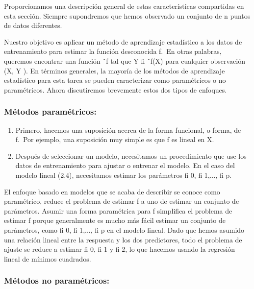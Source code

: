 \documentclass[
  letterpaper,
  DIV=11,
  numbers=noendperiod]{scrartcl}
\providecommand{\tightlist}{%
  \setlength{\itemsep}{0pt}\setlength{\parskip}{0pt}}\usepackage{longtable,booktabs,array}
\begin{document}
Proporcionamos una descripción general de estas características
compartidas en esta sección. Siempre supondremos que hemos observado un
conjunto de n puntos de datos diferentes.

Nuestro objetivo es aplicar un método de aprendizaje estadístico a los
datos de entrenamiento para estimar la función desconocida f.~En otras
palabras, queremos encontrar una función ˆf tal que Y fi ˆf(X) para
cualquier observación (X, Y ). En términos generales, la mayoría de los
métodos de aprendizaje estadístico para esta tarea se pueden
caracterizar como paramétricos o no paramétricos. Ahora discutiremos
brevemente estos dos tipos de enfoques.

\hypertarget{muxe9todos-paramuxe9tricos}{%
\subsubsection{\texorpdfstring{\textbf{Métodos
paramétricos:}}{Métodos paramétricos:}}\label{muxe9todos-paramuxe9tricos}}

\begin{enumerate}
\def\labelenumi{\arabic{enumi}.}
\tightlist
\item
  Primero, hacemos una suposición acerca de la forma funcional, o forma,
  de f.~Por ejemplo, una suposición muy simple es que f es lineal en X.
\item
  Después de seleccionar un modelo, necesitamos un procedimiento que use
  los datos de entrenamiento para ajustar o entrenar el modelo. En el
  caso del modelo lineal (2.4), necesitamos estimar los parámetros fi 0,
  fi 1,..., fi p.
\end{enumerate}

El enfoque basado en modelos que se acaba de describir se conoce como
paramétrico, reduce el problema de estimar f a uno de estimar un
conjunto de parámetros. Asumir una forma paramétrica para f simplifica
el problema de estimar f porque generalmente es mucho más fácil estimar
un conjunto de parámetros, como fi 0, fi 1,..., fi p en el modelo
lineal. Dado que hemos asumido una relación lineal entre la respuesta y
los dos predictores, todo el problema de ajuste se reduce a estimar fi
0, fi 1 y fi 2, lo que hacemos usando la regresión lineal de mínimos
cuadrados.

\hypertarget{muxe9todos-no-paramuxe9tricos}{%
\subsubsection{\texorpdfstring{\textbf{Métodos no
paramétricos:}}{Métodos no paramétricos:}}\label{muxe9todos-no-paramuxe9tricos}}
\end{document}
